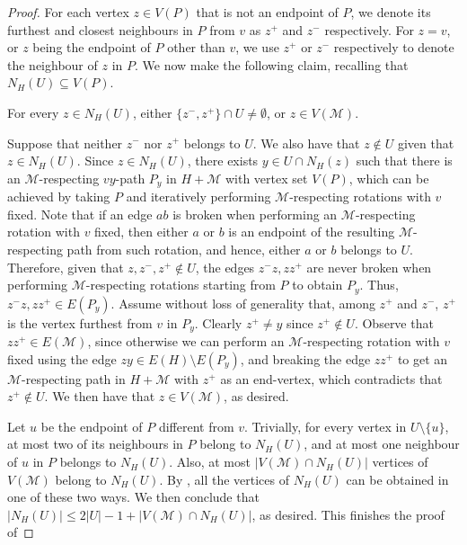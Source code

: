 \documentclass[10pt,a4paper,reqno]{amsart}
\begin{document}
\begin{proof}
For each vertex $z \in V(P)$ that is not an endpoint of $P$, we denote its furthest and closest neighbours in $P$ from $v$ as $z^+$ and $z^-$ respectively. For $z = v$, or $z$ being the endpoint of $P$ other than $v$, we use $z^+$ or $z^-$ respectively to denote the neighbour of $z$ in $P$. We now make the following claim, recalling that $N_H(U) \subseteq V(P)$.
\begin{claim}\label{claim:neigh_in_U_or_I_in_M}
    For every $z \in N_H(U)$, either $\{z^-, z^+\} \cap U \neq \emptyset$, or $z\in V(\mathcal{M})$.
\end{claim}
\begin{claimproof}
Suppose that neither $z^-$ nor $z^+$ belongs to $U$. We also have that $z \not\in U$ given that $z \in N_H(U)$. Since $z \in N_H(U)$, there exists $y \in U\cap N_H(z)$ such that there is an $\mathcal{M}$-respecting $vy$-path $P_y$ in $H + \mathcal{M}$ with vertex set $V(P)$, which can be achieved by taking $P$ and iteratively performing $\mathcal{M}$-respecting rotations with $v$ fixed. Note that if an edge $ab$ is broken when performing an $\mathcal{M}$-respecting rotation with $v$ fixed, then either $a$ or $b$ is an endpoint of the resulting $\mathcal{M}$-respecting path from such rotation, and hence, either $a$ or $b$ belongs to $U$. Therefore, given that $z, z^-, z^+ \not\in U$, the edges $z^-z, zz^+$ are never broken when performing $\mathcal{M}$-respecting rotations starting from $P$ to obtain $P_y$. Thus, $z^-z, zz^+ \in E(P_y)$. Assume without loss of generality that, among $z^+$ and $z^-$, $z^+$ is the vertex furthest from $v$ in $P_y$. Clearly $z^+ \neq y$ since $z^+ \not\in U$. Observe that $zz^+ \in E(\mathcal{M})$, since otherwise we can perform an $\mathcal{M}$-respecting rotation with $v$ fixed using the edge $zy \in E(H) \setminus E(P_y)$, and breaking the edge $zz^+$ to get an $\mathcal{M}$-respecting path in $H + \mathcal{M}$ with $z^+$ as an end-vertex, which contradicts that $z^+ \not\in U$. We then have that $z\in V(\mathcal{M})$, as desired.
\end{claimproof}
  
Let $u$ be the endpoint of $P$ different from $v$. Trivially, for every vertex in $U \setminus \{u\}$, at most two of its neighbours in $P$ belong to $N_H(U)$, and at most one neighbour of $u$ in $P$ belongs to $N_H(U)$. Also, at most $|V(\mathcal{M}) \cap N_H(U)|$ vertices of $V(\mathcal{M})$ belong to $N_H(U)$. By , all the vertices of $N_H(U)$ can be obtained in one of these two ways. We then conclude that $|N_H(U)| \leq 2|U| - 1 + |V(\mathcal{M}) \cap N_H(U)|$, as desired. This finishes the proof of 
\end{proof}
\end{document}
